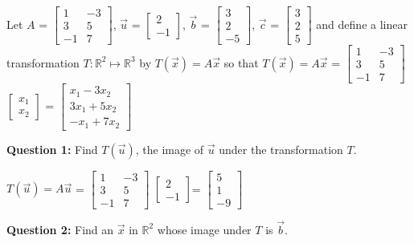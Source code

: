 \documentclass[10pt,landscape]{article}
\begin{document}
\begin{multicols}{4}
{{Let $A$ = $\left[
\begin{array}{rr}
1 & -3\\ 3 & 5\\-1 & 7
\end{array}
\right]$, $\vec{u}$ = $\left[
\begin{array}{rr}2 \\ -1
\end{array}
\right]$, $\vec{b}$ = $\left[
\begin{array}{rr}3 \\ 2 \\ -5
\end{array}
\right]$, $\vec{c}$ = $\left[
\begin{array}{rr}3 \\ 2 \\ 5
\end{array}
\right]$ and define a linear transformation $T \colon \mathbb{R}^2 \mapsto \mathbb{R}^3$ by $T(\vec{x}) = A\vec{x}$ so that $T(\vec{x}) = A\vec{x}$ = $\left[
\begin{array}{rr}
1 & -3\\ 3 & 5\\-1 & 7
\end{array}
\right]$  $\left[
\begin{array}{rr}x_1 \\ x_2
\end{array}
\right]$ =  $\left[
\begin{array}{rr}x_1 - 3x_2 \\ 3x_1 + 5x_2 \\ -x_1 + 7x_2
\end{array}
\right]$

\textbf{Question 1:} Find $T(\vec{u})$, the image of $\vec{u}$ under the transformation $T$.

$T(\vec{u}) = A\vec{u}$ = $\left[
\begin{array}{rr}
1 & -3\\ 3 & 5\\-1 & 7
\end{array}
\right]$ $\left[
\begin{array}{rr}2 \\ -1
\end{array}
\right]$=  $\left[
\begin{array}{rr}5 \\1 \\ -9
\end{array}
\right]$


\textbf{Question 2:} Find an $\vec{x}$ in $\mathbb{R}^2$ whose image under $T$ is $\vec{b}$. 

}}
\end{multicols}
\end{document}
